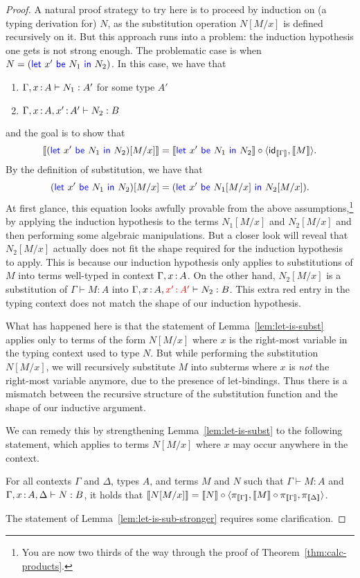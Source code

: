 \begin{proof}
  A natural proof strategy to try here is to proceed by induction on (a typing derivation for) \(N\),
  as the substitution operation \(N[M/x]\) is defined recursively on it.
  But this approach runs into a problem: the induction hypothesis one gets is not
  strong enough.
  The problematic case is when \(N = (\mathsf{{\color{blue}let}}~x'~\mathsf{{\color{blue}be}}~N_1~\mathsf{{\color{blue}in}}~N_2)\).
  In this case, we have that
  \begin{enumerate}
  \item \(\Gamma,x\,{:}\, A \vdash N_1 : A'\) for some type \(A'\)
  \item \(\Gamma,x\,{:}\, A,x'\,{:}\, A' \vdash N_2 : B\)
  \end{enumerate}
  and the goal is to show that
  \begin{equation}
    \left\llbracket (\mathsf{{\color{blue}let}}~x'~\mathsf{{\color{blue}be}}~N_1~\mathsf{{\color{blue}in}}~N_2)[M/x]\right\rrbracket = \left\llbracket \mathsf{{\color{blue}let}}~x'~\mathsf{{\color{blue}be}}~N_1~\mathsf{{\color{blue}in}}~N_2\right\rrbracket \circ \langle \mathsf{id}_{\left\llbracket \Gamma\right\rrbracket},\left\llbracket M\right\rrbracket\rangle.
  \end{equation}
  By the definition of substitution, we have that
  \[
  (\mathsf{{\color{blue}let}}~x'~\mathsf{{\color{blue}be}}~N_1~\mathsf{{\color{blue}in}}~N_2)[M/x] = (\mathsf{{\color{blue}let}}~x'~\mathsf{{\color{blue}be}}~N_1[M/x]~\mathsf{{\color{blue}in}}~N_2[M/x]).
  \]
  At first glance, this equation looks awfully provable from the above assumptions,\footnote{%
    You are now two thirds of the way through the proof of Theorem~\ref{thm:calc-products}.}
  by applying the induction hypothesis to
  the terms \(N_1[M/x]\) and \(N_2[M/x]\) and then performing some algebraic manipulations.
  But a closer look will reveal that \(N_2[M/x]\) actually does not fit the shape required
  for the induction hypothesis to apply.
  This is because our induction hypothesis only applies to substitutions of \(M\)
  into terms well-typed in context \(\Gamma,x\,{:}\, A\).
  On the other hand, \(N_2[M/x]\) is a substitution
  of \(\Gamma \vdash M : A\) into \(\Gamma,x\,{:}\, A,{\color{red}x'\,{:}\, A'} \vdash N_2 : B\).
  This extra red entry in the typing context does not match the shape of our induction hypothesis.

  What has happened here is that the statement of Lemma~\ref{lem:let-is-subst}
  applies only to terms of the form \(N[M/x]\) where \(x\) is the right-most variable
  in the typing context used to type \(N\). But while performing the substitution \(N[M/x]\),
  we will recursively substitute \(M\) into subterms where \(x\) is \emph{not} the right-most variable
  anymore, due to the presence of let-bindings.
  Thus there is a mismatch between the recursive structure of the substitution function
  and the shape of our inductive argument.

  We can remedy this by strengthening Lemma~\ref{lem:let-is-subst}
  to the following statement, which applies to terms \(N[M/x]\) where \(x\) may occur anywhere in the context.
  \begin{lemma} \label{lem:let-is-sub-stronger}
    For all contexts \(\Gamma\) and \(\Delta\), types \(A\),
    and terms \(M\) and \(N\)
    such that \(\Gamma \vdash M : A\)
    and \(\Gamma,x\,{:}\, A,\Delta \vdash N : B\),
    it holds that
    \(\left\llbracket N[M/x]\right\rrbracket = \left\llbracket N\right\rrbracket \circ \langle \pi_{\left\llbracket \Gamma\right\rrbracket},\left\llbracket M\right\rrbracket \circ \pi_{\left\llbracket \Gamma\right\rrbracket},\pi_{\left\llbracket \Delta\right\rrbracket}\rangle\).
  \end{lemma}
  The statement of Lemma~\ref{lem:let-is-sub-stronger} requires some clarification.


\end{proof}
